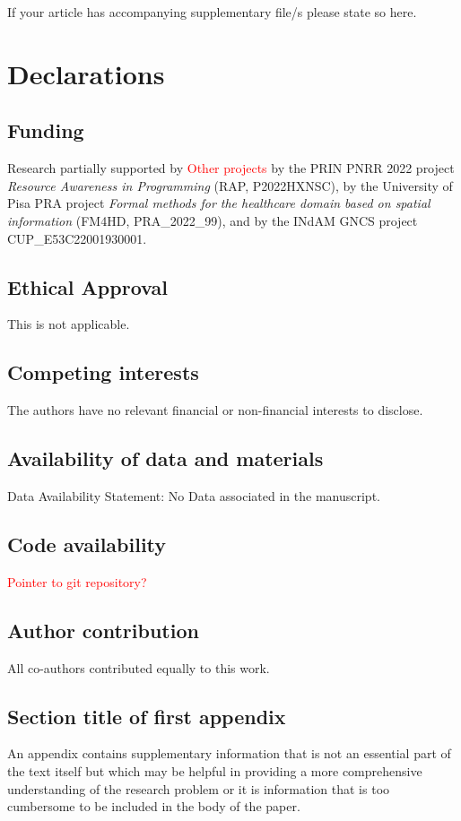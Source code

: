 \documentclass[sn-mathphys-num,a4paper,iicol,lineno,pdflatex]{sn-jnl-hacked}
\theoremstyle{thmstyleone}%
\theoremstyle{thmstyletwo}%
\theoremstyle{thmstylethree}%
\begin{document}
If your article has accompanying supplementary file/s please state so here. 


\section*{Declarations}

\subsection*{Funding}

Research partially supported 
by \textcolor{red}{Other projects}
by the PRIN PNRR 2022 project \emph{Resource Awareness in Programming} (RAP, P2022HXNSC),
by the University of Pisa PRA project \emph{Formal methods for the healthcare domain based on spatial information} (FM4HD, PRA\_2022\_99),
and by the INdAM GNCS project CUP\_E53C22001930001.

\subsection*{Ethical Approval}
This is not applicable.
 
\subsection*{Competing interests}
The authors have no relevant financial or non-financial interests to disclose.

\subsection*{Availability of data and materials}
Data Availability Statement: No Data associated in the manuscript.

\subsection*{Code availability}

\textcolor{red}{Pointer to git repository?}

\subsection*{Author contribution}

All co-authors contributed equally to this work.

\begin{appendices}

\section{Section title of first appendix}

An appendix contains supplementary information that is not an essential part of the text itself but which may be helpful in providing a more comprehensive understanding of the research problem or it is information that is too cumbersome to be included in the body of the paper.

\end{appendices}



\end{document}
